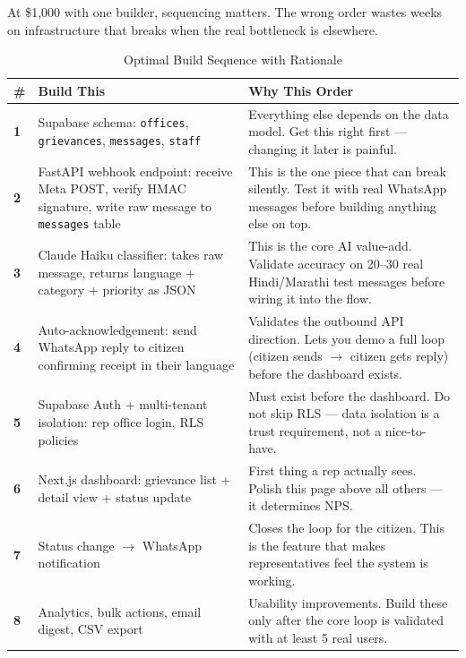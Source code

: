 \documentclass[12pt, a4paper]{article}
\begin{document}
At \$1,000 with one builder, sequencing matters. The wrong order wastes weeks on
infrastructure that breaks when the real bottleneck is elsewhere.

\begin{table}[ht]
\centering
\caption{Optimal Build Sequence with Rationale}
\renewcommand{\arraystretch}{1.5}
\begin{tabularx}{\textwidth}{>{\centering\bfseries}p{0.6cm} X p{3.5cm}}
\toprule
\rowcolor{pollitylightblue}
\textbf{\#} & \textbf{Build This} & \textbf{Why This Order} \\
\midrule
1 & Supabase schema: \texttt{offices}, \texttt{grievances}, \texttt{messages}, \texttt{staff} & Everything else depends on the data model. Get this right first --- changing it later is painful. \\
\midrule
2 & FastAPI webhook endpoint: receive Meta POST, verify HMAC signature, write raw message to \texttt{messages} table & This is the one piece that can break silently. Test it with real WhatsApp messages before building anything else on top. \\
\midrule
3 & Claude Haiku classifier: takes raw message, returns language + category + priority as JSON & This is the core AI value-add. Validate accuracy on 20--30 real Hindi/Marathi test messages before wiring it into the flow. \\
\midrule
4 & Auto-acknowledgement: send WhatsApp reply to citizen confirming receipt in their language & Validates the outbound API direction. Lets you demo a full loop (citizen sends $\to$ citizen gets reply) before the dashboard exists. \\
\midrule
5 & Supabase Auth + multi-tenant isolation: rep office login, RLS policies & Must exist before the dashboard. Do not skip RLS --- data isolation is a trust requirement, not a nice-to-have. \\
\midrule
6 & Next.js dashboard: grievance list + detail view + status update & First thing a rep actually sees. Polish this page above all others --- it determines NPS. \\
\midrule
7 & Status change $\to$ WhatsApp notification & Closes the loop for the citizen. This is the feature that makes representatives feel the system is working. \\
\midrule
8 & Analytics, bulk actions, email digest, CSV export & Usability improvements. Build these only after the core loop is validated with at least 5 real users. \\
\bottomrule
\end{tabularx}
\end{table}
\end{document}
